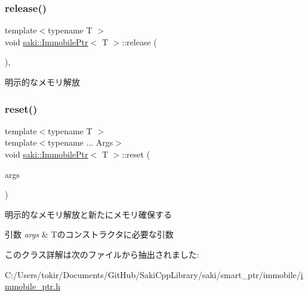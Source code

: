 \subsubsection{\texorpdfstring{release()}{release()}}
{\footnotesize\ttfamily template$<$typename T $>$ \\
void \mbox{\hyperlink{classsaki_1_1_immobile_ptr}{saki\+::\+Immobile\+Ptr}}$<$ T $>$\+::release (\begin{DoxyParamCaption}{ }\end{DoxyParamCaption})\hspace{0.3cm}{\ttfamily [inline]}, {\ttfamily [noexcept]}}



明示的なメモリ解放 

\mbox{\label{classsaki_1_1_immobile_ptr_abc92fb9bf2200ecc6304164ae6c00e09}} 
\subsubsection{\texorpdfstring{reset()}{reset()}}
{\footnotesize\ttfamily template$<$typename T $>$ \\
template$<$typename ... Args$>$ \\
void \mbox{\hyperlink{classsaki_1_1_immobile_ptr}{saki\+::\+Immobile\+Ptr}}$<$ T $>$\+::reset (\begin{DoxyParamCaption}\item[{Args ...}]{args }\end{DoxyParamCaption})\hspace{0.3cm}{\ttfamily [inline]}}



明示的なメモリ解放と新たにメモリ確保する 


\begin{DoxyParams}{引数}
{\em args} & Tのコンストラクタに必要な引数 \\
\hline
\end{DoxyParams}


このクラス詳解は次のファイルから抽出されました\+:\begin{DoxyCompactItemize}
\item 
C\+:/\+Users/tokir/\+Documents/\+Git\+Hub/\+Saki\+Cpp\+Library/saki/smart\+\_\+ptr/immobile/\mbox{\hyperlink{immobile__ptr_8h}{immobile\+\_\+ptr.\+h}}\end{DoxyCompactItemize}

